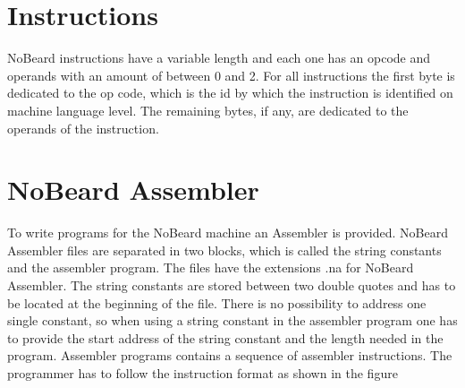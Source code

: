 \section{Instructions}\label{sec:instructions}
NoBeard instructions have a variable length and each one has an opcode and operands with an amount of between 0 and 2. For all instructions the first byte is dedicated to the op code, which is the id by which the instruction is identified on machine language level. The remaining bytes, if any, are dedicated to the operands of the instruction. 
\section{NoBeard Assembler}
To write programs for the NoBeard machine an Assembler is provided. NoBeard Assembler files are separated in two blocks, which is called the string constants and the assembler program. The files have the extensions .na for NoBeard Assembler. The string constants are stored between two double quotes and has to be located at the beginning of the file. There is no possibility to address one single constant, so when using a string constant in the assembler program one has to provide the start address of the string constant and the length needed in the program.  Assembler programs contains a sequence of assembler instructions. The programmer has to follow the instruction format as shown in the figure